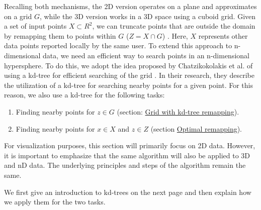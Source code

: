 Recalling both mechanisms, the 2D version operates on a plane and approximates on a grid $G$, while the 3D version works in a 3D space using a cuboid grid.
Given a set of input points $X \subset R^2$, we can truncate points that are outside the domain by remapping them to points within $G$ ($Z = X \cap G$) \citep{DBLP:journals/corr/abs-1212-1984}.
Here, $X$ represents other data points reported locally by the same user.
To extend this approach to n-dimensional data, we need an efficient way to search points in an n-dimensional hypersphere.
To do this, we adopt the idea proposed by Chatzikokolakis et al. of using a kd-tree for efficient searching of the grid \citep{chatzikokolakis_efficient_2017}.
In their research, they describe the utilization of a kd-tree for searching nearby points for a given point.
For this reason, we also use a kd-tree for the following tasks:
\begin{enumerate}
  \item Finding nearby points for $z \in G$ (section: \hyperref[theory:grid-remapping]{Grid with kd-tree remapping}).
  \item Finding nearby points for $x \in X$ and $z \in Z$ (section \hyperref[theory:optimal-remapping]{Optimal remapping}).
\end{enumerate}
For visualization purposes, this section will primarily focus on 2D data.
However, it is important to emphasize that the same algorithm will also be applied to 3D and nD data. The underlying principles and steps of the algorithm remain the same.

We first give an introduction to kd-trees on the next page and then explain how we apply them for the two tasks.

\newpage
